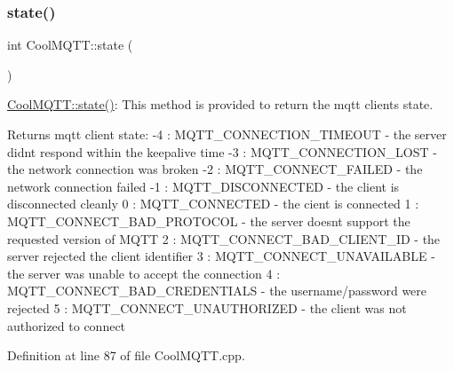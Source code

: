 \subsubsection{\texorpdfstring{state()}{state()}}
{\footnotesize\ttfamily int Cool\+M\+Q\+T\+T\+::state (\begin{DoxyParamCaption}{ }\end{DoxyParamCaption})}

\hyperlink{class_cool_m_q_t_t_a5d003307eff78efbd585e42b43b72b6d}{Cool\+M\+Q\+T\+T\+::state()}\+: This method is provided to return the mqtt client\textquotesingle{}s state. \begin{DoxyReturn}{Returns}
mqtt client state\+: -\/4 \+: M\+Q\+T\+T\+\_\+\+C\+O\+N\+N\+E\+C\+T\+I\+O\+N\+\_\+\+T\+I\+M\+E\+O\+UT -\/ the server didn\textquotesingle{}t respond within the keepalive time -\/3 \+: M\+Q\+T\+T\+\_\+\+C\+O\+N\+N\+E\+C\+T\+I\+O\+N\+\_\+\+L\+O\+ST -\/ the network connection was broken -\/2 \+: M\+Q\+T\+T\+\_\+\+C\+O\+N\+N\+E\+C\+T\+\_\+\+F\+A\+I\+L\+ED -\/ the network connection failed -\/1 \+: M\+Q\+T\+T\+\_\+\+D\+I\+S\+C\+O\+N\+N\+E\+C\+T\+ED -\/ the client is disconnected cleanly 0 \+: M\+Q\+T\+T\+\_\+\+C\+O\+N\+N\+E\+C\+T\+ED -\/ the cient is connected 1 \+: M\+Q\+T\+T\+\_\+\+C\+O\+N\+N\+E\+C\+T\+\_\+\+B\+A\+D\+\_\+\+P\+R\+O\+T\+O\+C\+OL -\/ the server doesn\textquotesingle{}t support the requested version of M\+Q\+TT 2 \+: M\+Q\+T\+T\+\_\+\+C\+O\+N\+N\+E\+C\+T\+\_\+\+B\+A\+D\+\_\+\+C\+L\+I\+E\+N\+T\+\_\+\+ID -\/ the server rejected the client identifier 3 \+: M\+Q\+T\+T\+\_\+\+C\+O\+N\+N\+E\+C\+T\+\_\+\+U\+N\+A\+V\+A\+I\+L\+A\+B\+LE -\/ the server was unable to accept the connection 4 \+: M\+Q\+T\+T\+\_\+\+C\+O\+N\+N\+E\+C\+T\+\_\+\+B\+A\+D\+\_\+\+C\+R\+E\+D\+E\+N\+T\+I\+A\+LS -\/ the username/password were rejected 5 \+: M\+Q\+T\+T\+\_\+\+C\+O\+N\+N\+E\+C\+T\+\_\+\+U\+N\+A\+U\+T\+H\+O\+R\+I\+Z\+ED -\/ the client was not authorized to connect 
\end{DoxyReturn}


Definition at line 87 of file Cool\+M\+Q\+T\+T.\+cpp.

